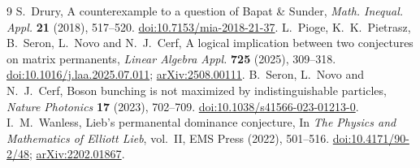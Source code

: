 \documentclass[11pt]{article}
\begin{document}
\begin{thebibliography}{9}
 S.~Drury, A counterexample to a question of Bapat \& Sunder,
\emph{Math. Inequal. Appl.} \textbf{21} (2018), 517--520.
\href{https://doi.org/10.7153/mia-2018-21-37}{doi:10.7153/mia-2018-21-37}.
 L.~Pioge, K.~K.~Pietrasz, B.~Seron, L.~Novo and N.~J.~Cerf,
A logical implication between two conjectures on matrix permanents,
\emph{Linear Algebra Appl.} \textbf{725} (2025), 309--318.
\href{https://doi.org/10.1016/j.laa.2025.07.011}{doi:10.1016/j.laa.2025.07.011};
\href{https://arxiv.org/abs/2508.00111}{arXiv:2508.00111}.
 B.~Seron, L.~Novo and N.~J.~Cerf,
Boson bunching is not maximized by indistinguishable particles,
\emph{Nature Photonics} \textbf{17} (2023), 702--709.
\href{https://doi.org/10.1038/s41566-023-01213-0}{doi:10.1038/s41566-023-01213-0}.
 I.~M.~Wanless, Lieb's permanental dominance conjecture,
In \emph{The Physics and Mathematics of Elliott Lieb}, vol.~II,
EMS Press (2022), 501--516.
\href{https://doi.org/10.4171/90-2/48}{doi:10.4171/90-2/48};
\href{https://arxiv.org/abs/2202.01867}{arXiv:2202.01867}.
\end{thebibliography}
\end{document}
